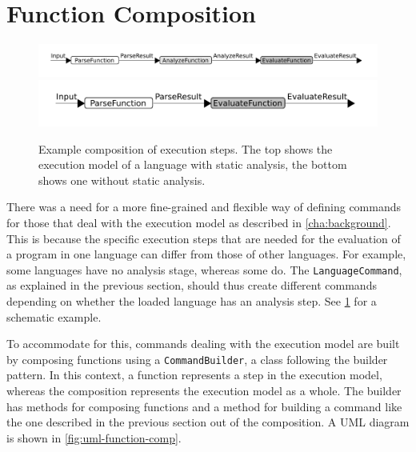 \makeatletter
\Gscale@div\imgscale\textwidth{\wd0}
\makeatother
%
\section{Function Composition}
\label{sec:function-comp}
\begin{figure}[t]
  \includegraphics[scale=\imgscale]{unit-flow}
  \includegraphics[scale=\imgscale]{unit-flow-no-analyze}
  \caption{Example composition of execution steps. The top shows the
    execution model of a language with static analysis,
    the bottom shows one without static analysis. }
  \label{fig:unit-flow}
\end{figure}

There was a need for a more fine-grained and flexible way of defining commands
for those that deal with the execution model as described in
\cref{cha:background}. This is because the specific
execution steps that are needed for the evaluation of a program in one language
can differ from those of other languages. For example, some languages
have no analysis stage, whereas some do. The \texttt{LanguageCommand}, as
explained in the previous section, should thus create different
commands depending on whether the loaded language has an
analysis step. See \cref{fig:unit-flow} for a schematic example.

To accommodate for this, commands dealing with the execution model are
built by composing functions using a \texttt{CommandBuilder}, a class
following the builder pattern. In this context, a function represents a
step in the execution model, whereas the composition represents the
execution model as a whole. The builder has methods for composing
functions and a method for building a command like the one described
in the previous section out of the composition. A UML diagram is shown
in \cref{fig:uml-function-comp}.

